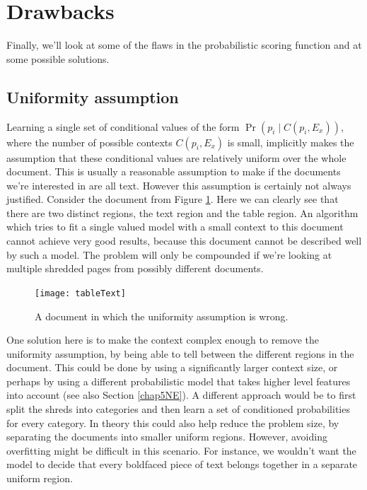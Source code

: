\section{Drawbacks}

Finally, we'll look at some of the flaws in the probabilistic scoring function and at some possible solutions.

\subsection{Uniformity assumption}
Learning a single set of conditional values of the form \(\Pr(p_i \mid C(p_i,E_x)) \), where the number of possible contexts $C(p_i,E_x)$ is small, implicitly makes the assumption that these conditional values are relatively uniform over the whole document. This is usually a reasonable assumption to make if the documents we're interested in are all text. However this assumption is certainly not always justified. Consider the document from Figure \ref{fig:tableText}. Here we can clearly see that there are two distinct regions, the text region and the table region. An algorithm which tries to fit a single valued model with a small context to this document cannot achieve very good results, because this document cannot be described well by such a model. The problem will only be compounded if we're looking at multiple shredded pages from possibly different documents.

\begin{figure}[h]
\centering
\texttt{[image: tableText]}
\caption{A document in which the uniformity assumption is wrong.}
\label{fig:tableText}
\end{figure}

One solution here is to make the context complex enough to remove the uniformity assumption, by being able to tell between the different regions in the document. This could be done by using a significantly larger context size, or perhaps by using a different probabilistic model that takes higher level features into account (see also Section \ref{chap5NE}). A different approach would be to first split the shreds into categories and then learn a set of conditioned probabilities for every category. In theory this could also help reduce the problem size, by separating the documents into smaller uniform regions. However, avoiding overfitting might be difficult in this scenario. For instance, we wouldn't want the model to decide that every boldfaced piece of text belongs together in a separate uniform region.

